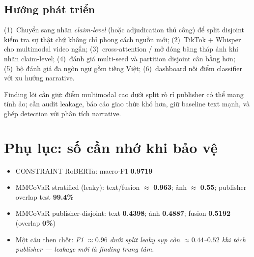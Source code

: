 \documentclass[12pt, a4paper]{report}
\begin{document}
\section{Hướng phát triển}
\label{sec:future-work}

(1)~Chuyển sang nhãn \emph{claim-level} (hoặc adjudication thủ công) để split disjoint kiểm tra sự thật chứ không chỉ phong cách nguồn mới;
(2)~TikTok + Whisper cho multimodal video ngắn;
(3)~cross-attention / mở đóng băng tháp ảnh khi nhãn claim-level;
(4)~đánh giá multi-seed và partition disjoint cân bằng hơn;
(5)~bộ đánh giá đa ngôn ngữ gồm tiếng Việt;
(6)~dashboard nối điểm classifier với xu hướng narrative.

Finding lõi cần giữ: điểm multimodal cao dưới split rò rỉ publisher có thể mang tính ảo; cần audit leakage, báo cáo giao thức khó hơn, giữ baseline text mạnh, và ghép detection với phân tích narrative.

\clearpage
{}
\printbibliography[title=Tài liệu tham khảo]

\appendix
\chapter{Phụ lục: số cần nhớ khi bảo vệ}
\begin{itemize}
  \item CONSTRAINT RoBERTa: macro-F1 \textbf{0.9719}
  \item MMCoVaR stratified (leaky): text/fusion $\approx$ \textbf{0.963}; ảnh $\approx$ \textbf{0.55}; publisher overlap test \textbf{99.4\%}
  \item MMCoVaR publisher-disjoint: text \textbf{0.4398}; ảnh \textbf{0.4887}; fusion \textbf{0.5192} (overlap \textbf{0\%})
  \item Một câu then chốt: \emph{F1 $\approx 0.96$ dưới split leaky sụp còn $\approx 0.44$--$0.52$ khi tách publisher --- leakage mới là finding trung tâm.}
\end{itemize}
\end{document}
